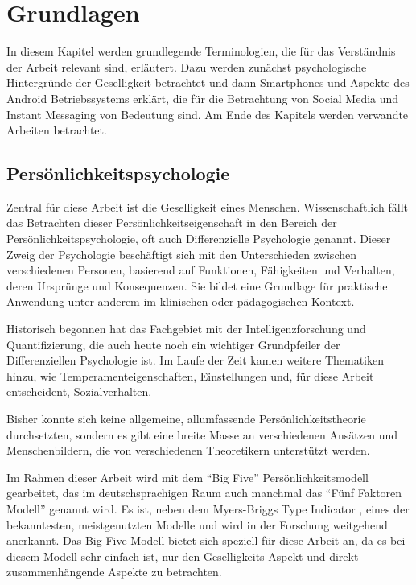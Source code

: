 
\chapter{Grundlagen}
\label{ch:Grundlagen}

In diesem Kapitel werden grundlegende Terminologien, die für das Verständnis der Arbeit relevant sind, erläutert.
Dazu werden zunächst psychologische Hintergründe der Geselligkeit betrachtet und
dann Smartphones und Aspekte des Android Betriebssystems erklärt, die für die Betrachtung von Social Media und Instant Messaging von Bedeutung sind.
Am Ende des Kapitels werden verwandte Arbeiten betrachtet.

\section{Persönlichkeitspsychologie}
\label{ch:Grundlagen:sec:Abschnitt1}

Zentral für diese Arbeit ist die Geselligkeit eines Menschen.
Wissenschaftlich fällt das Betrachten dieser Persönlichkeitseigenschaft in den Bereich der Persönlichkeitspsychologie,
oft auch Differenzielle Psychologie genannt. 
Dieser Zweig der Psychologie beschäftigt sich mit den Unterschieden zwischen verschiedenen Personen, 
basierend auf Funktionen, Fähigkeiten und Verhalten, deren Ursprünge und Konsequenzen.
Sie bildet eine Grundlage für praktische Anwendung unter anderem im klinischen oder pädagogischen Kontext.
\par

Historisch begonnen hat das Fachgebiet mit der Intelligenzforschung und Quantifizierung, 
die auch heute noch ein wichtiger Grundpfeiler der Differenziellen Psychologie ist.
Im Laufe der Zeit kamen weitere Thematiken hinzu, wie Temperamenteigenschaften, Einstellungen und, für diese Arbeit entscheident, Sozialverhalten.
\par

Bisher konnte sich keine allgemeine, allumfassende Persönlichkeitstheorie durchsetzten, sondern es gibt eine breite Masse an verschiedenen Ansätzen und Menschenbildern, die von verschiedenen Theoretikern unterstützt werden.
Im Rahmen dieser Arbeit wird mit dem "`Big Five"' Persönlichkeitsmodell gearbeitet, das im deutschsprachigen Raum auch manchmal das "`Fünf Faktoren Modell"' genannt wird.
Es ist, neben dem Myers-Briggs Type Indicator \cite{briggs1980gifts}, eines der bekanntesten, meistgenutzten Modelle und wird in der Forschung weitgehend anerkannt.
Das Big Five Modell bietet sich speziell für diese Arbeit an, da es bei diesem Modell sehr einfach ist, nur den Geselligkeits Aspekt und direkt zusammenhängende Aspekte zu betrachten.

